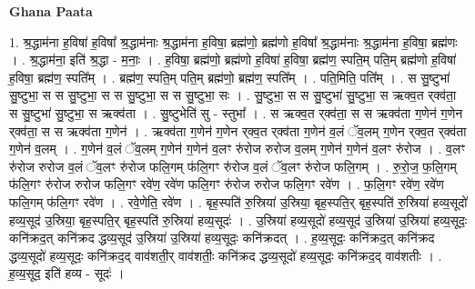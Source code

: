 \documentclass[17pt]{extarticle}
\begin{document}
\textbf{Ghana Paata } \newline

1. श्र॒द्धाम॑ना ह॒विषा॑ ह॒विषा᳚ श्र॒द्धाम॑नाः श्र॒द्धाम॑ना ह॒विषा॒ ब्रह्म॑णो॒ ब्रह्म॑णो ह॒विषा᳚ श्र॒द्धाम॑नाः श्र॒द्धाम॑ना ह॒विषा॒ ब्रह्म॑णः । . श्र॒द्धाम॑ना॒ इति॑ श्र॒द्धा - म॒नाः॒ । . ह॒विषा॒ ब्रह्म॑णो॒ ब्रह्म॑णो ह॒विषा॑ ह॒विषा॒ ब्रह्म॑ण॒ स्पति॒म् पति॒म् ब्रह्म॑णो ह॒विषा॑ ह॒विषा॒ ब्रह्म॑ण॒ स्पति᳚म् । . ब्रह्म॑ण॒ स्पति॒म् पति॒म् ब्रह्म॑णो॒ ब्रह्म॑ण॒ स्पति᳚म् । . पति॒मिति॒ पति᳚म् । . स सु॒ष्टुभा॑ सु॒ष्टुभा॒ स स सु॒ष्टुभा॒ स स सु॒ष्टुभा॒ स स सु॒ष्टुभा॒ सः । . सु॒ष्टुभा॒ स स सु॒ष्टुभा॑ सु॒ष्टुभा॒ स ऋक्व॒त र्‌क्व॑ता॒ स सु॒ष्टुभा॑ सु॒ष्टुभा॒ स ऋक्व॑ता । . सु॒ष्टुभेति॑ सु - स्तुभा᳚ । . स ऋक्व॒त र्‌क्व॑ता॒ स स ऋक्व॑ता ग॒णेन॑ ग॒णेन र्‌क्व॑ता॒ स स ऋक्व॑ता ग॒णेन॑ । . ऋक्व॑ता ग॒णेन॑ ग॒णेन र्‌क्व॒त र्‌क्व॑ता ग॒णेन॑ व॒लं ॅव॒लम् ग॒णेन र्‌क्व॒त र्‌क्व॑ता ग॒णेन॑ व॒लम् । . ग॒णेन॑ व॒लं ॅव॒लम् ग॒णेन॑ ग॒णेन॑ व॒लꣳ रु॑रोज रुरोज व॒लम् ग॒णेन॑ ग॒णेन॑ व॒लꣳ रु॑रोज । . व॒लꣳ रु॑रोज रुरोज व॒लं ॅव॒लꣳ रु॑रोज फलि॒गम् फ॑लि॒गꣳ रु॑रोज व॒लं ॅव॒लꣳ रु॑रोज फलि॒गम् । . रु॒रो॒ज॒ फ॒लि॒गम् फ॑लि॒गꣳ रु॑रोज रुरोज फलि॒गꣳ रवे॑ण॒ रवे॑ण फलि॒गꣳ रु॑रोज रुरोज फलि॒गꣳ रवे॑ण । . फ॒लि॒गꣳ रवे॑ण॒ रवे॑ण फलि॒गम् फ॑लि॒गꣳ रवे॑ण । . रवे॒णेति॒ रवे॑ण । . बृह॒स्पति॑ रु॒स्रिया॑ उ॒स्रिया॒ बृह॒स्पति॒र् बृह॒स्पति॑ रु॒स्रिया॑ हव्य॒सूदो॑ हव्य॒सूद॑ उ॒स्रिया॒ बृह॒स्पति॒र् बृह॒स्पति॑ रु॒स्रिया॑ हव्य॒सूदः॑ । . उ॒स्रिया॑ हव्य॒सूदो॑ हव्य॒सूद॑ उ॒स्रिया॑ उ॒स्रिया॑ हव्य॒सूदः॒ कनि॑क्रद॒त् कनि॑क्रद द्धव्य॒सूद॑ उ॒स्रिया॑ उ॒स्रिया॑ हव्य॒सूदः॒ कनि॑क्रदत् । . ह॒व्य॒सूदः॒ कनि॑क्रद॒त् कनि॑क्रद द्धव्य॒सूदो॑ हव्य॒सूदः॒ कनि॑क्रद॒द् वाव॑शती॒र् वाव॑शतीः॒ कनि॑क्रद द्धव्य॒सूदो॑ हव्य॒सूदः॒ कनि॑क्रद॒द् वाव॑शतीः । . ह॒व्य॒सूद॒ इति॑ हव्य - सूदः॑ । \newline
\end{document}
